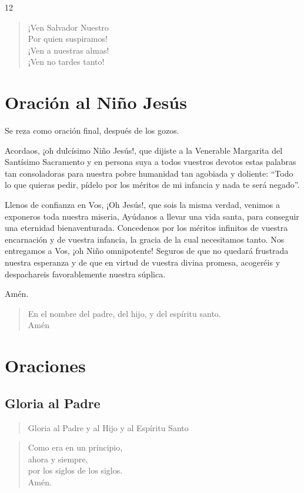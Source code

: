 \documentclass[spanish,utf8,twocolumn]{chlart}
\newenvironment{summary}{\begingroup
	\small\sffamily\itshape%
	\setlength{\leftskip}{3em}\setlength{\rightskip}{3em}\noindent
	}{\par\endgroup}
\newenvironment{lectura}{\begingroup\color{lector}}{\endgroup\par}
\newenvironment{uno}{%
	\begin{verse}\color{lector}}{\end{verse}}
\newenvironment{todos}{%
	\begin{verse}\color{responden}}{\end{verse}}
\newenvironment{gozo}{\begin{verse}\color{lector}}{\end{verse}}
\newcommand*\vena{{\color{responden}\hspace{1em}¡Ven a nuestras almas!\\\hspace{1em}¡Ven no tardes tanto!}}
\begin{document}
12
\begin{gozo}
¡Ven Salvador Nuestro\\
Por quien suspiramos!\\
\vena
\end{gozo}
\newpage 
\section{Oración al Niño Jesús}
\begin{summary}
Se reza como oración final, después de los gozos.
\end{summary}
\begin{lectura}
Acordaos, ¡oh dulcísimo Niño Jesús!, que dijiste a la Venerable
Margarita del Santísimo Sacramento y en persona suya a todos vuestros
devotos estas palabras tan consoladoras para nuestra pobre humanidad tan
agobiada y doliente:
“Todo lo que quieras pedir, pídelo por los méritos de mi infancia y nada
te será negado”.

Llenos de confianza en Vos, ¡Oh Jesús!, que sois la misma verdad,
venimos a exponeros toda nuestra miseria, Ayúdanos a llevar una vida
santa, para conseguir una eternidad bienaventurada.
Concedenos por los méritos infinitos de vuestra encarnación y de vuestra
infancia, la gracia de la cual necesitamos tanto.
Nos entregamos a Vos, ¡oh Niño omnipotente!
Seguros de que no quedará frustrada nuestra esperanza y de que en virtud
de vuestra divina promesa, acogeréis y despachareis favorablemente
nuestra súplica.

Amén.
\end{lectura}
\newpage
\begin{gozo}
En el nombre del padre, del hijo, y del espíritu santo.\\Amén
\end{gozo}

\section*{Oraciones}
\subsection*{Gloria al Padre}

\begin{uno}
Gloria al Padre y al Hijo y al Espíritu Santo
\end{uno}

\begin{todos}
Como era en un principio,\\ahora y siempre,\\por los siglos de los siglos.\\
Amén.
\end{todos}
\end{document}
